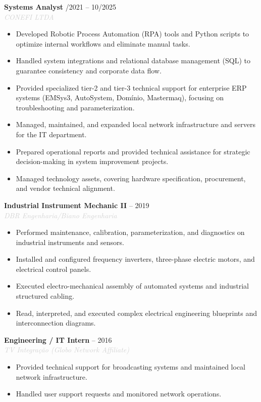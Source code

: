 \documentclass[10pt,a4paper]{article}
\newcommand{\cvevent}[4]{
    \noindent \textbf{#2} \hfill \textcolor{sectcol}{\small \faCalendar* #1} \\
    \noindent \textit{\textcolor{lightgray}{#3}} \vspace{4pt} \\
    {#4} \vspace{8pt}
}
\begin{document}
\cvevent{06/2021 – 10/2025}{Systems Analyst}{CONEFI LTDA}{
\begin{itemize}
    \item Developed Robotic Process Automation (RPA) tools and Python scripts to optimize internal workflows and eliminate manual tasks.
    \item Handled system integrations and relational database management (SQL) to guarantee consistency and corporate data flow.
    \item Provided specialized tier-2 and tier-3 technical support for enterprise ERP systems (EMSys3, AutoSystem, Domínio, Mastermaq), focusing on troubleshooting and parameterization.
    \item Managed, maintained, and expanded local network infrastructure and servers for the IT department.
    \item Prepared operational reports and provided technical assistance for strategic decision-making in system improvement projects.
    \item Managed technology assets, covering hardware specification, procurement, and vendor technical alignment.
\end{itemize}
}

\cvevent{2016 – 2019}{Industrial Instrument Mechanic II}{DBR Engenharia/Biano Engenharia}{
\begin{itemize}
    \item Performed maintenance, calibration, parameterization, and diagnostics on industrial instruments and sensors.   
    \item Installed and configured frequency inverters, three-phase electric motors, and electrical control panels.  
    \item Executed electro-mechanical assembly of automated systems and industrial structured cabling.  
    \item Read, interpreted, and executed complex electrical engineering blueprints and interconnection diagrams.
\end{itemize}
}

\cvevent{2014 – 2016}{Engineering / IT Intern}{TV Integração (Globo Network Affiliate)}{
\begin{itemize}
    \item Provided technical support for broadcasting systems and maintained local network infrastructure.
    \item Handled user support requests and monitored network operations.
\end{itemize}
}
\end{document}
